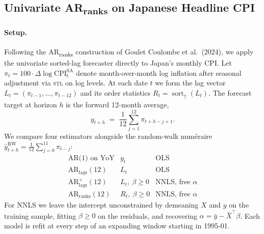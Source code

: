 
\subsection{Univariate AR\textsubscript{ranks} on Japanese Headline CPI}
\label{subsec:ar_ranks_japan}

\paragraph{Setup.}
Following the AR\textsubscript{ranks} construction of Goulet Coulombe et al.\
(2024), we apply the univariate sorted-lag forecaster directly to Japan's
monthly CPI. Let $\pi_t = 100 \cdot \Delta \log \mathrm{CPI}_t^{\text{SA}}$
denote month-over-month log inflation after seasonal adjustment via
\textsc{stl} on log levels. At each date $t$ we form the lag vector
$L_t = (\pi_{t-1}, \dots, \pi_{t-12})$ and its order statistics
$R_t = \operatorname{sort}_{\uparrow}(L_t)$. The forecast target at horizon $h$
is the forward 12-month average,
\[
y_{t+h} \;=\; \frac{1}{12}\sum_{j=1}^{12}\pi_{t+h-j+1}.
\]
We compare four estimators alongside the random-walk numéraire
$\hat{y}^{\text{RW}}_{t+h} = \tfrac{1}{12}\sum_{j=0}^{11}\pi_{t-j}$:
\[
\begin{array}{lll}
\text{AR(1) on YoY}                       & y_t                 & \text{OLS} \\
\text{AR}_{\text{lags}}(12)               & L_t                 & \text{OLS} \\
\text{AR}^{+}_{\text{lags}}(12)           & L_t,\ \beta\!\ge\!0 & \text{NNLS, free }\alpha \\
\text{AR}_{\text{ranks}}(12)              & R_t,\ \beta\!\ge\!0 & \text{NNLS, free }\alpha
\end{array}
\]
For NNLS we leave the intercept unconstrained by demeaning $X$ and $y$ on
the training sample, fitting $\beta \!\ge\! 0$ on the residuals, and recovering
$\alpha = \bar y - \bar X^{\!\top}\!\beta$. Each model is refit at every step
of an expanding window starting in 1995-01.

